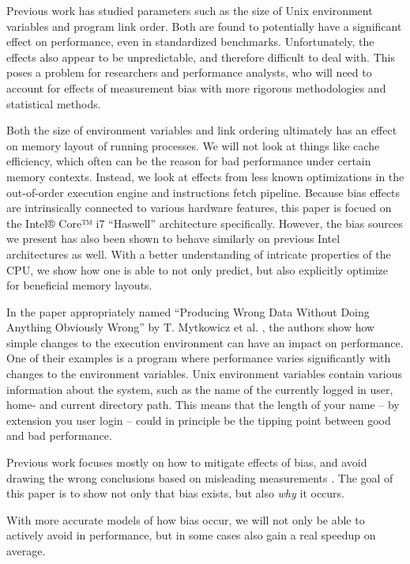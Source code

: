 \documentclass[a4paper,11pt,twocolumn,twoside]{article}
\begin{document}
Previous work has studied parameters such as the size of Unix environment variables and program link order. 
Both are found to potentially have a significant effect on performance, even in standardized benchmarks. 
Unfortunately, the effects also appear to be unpredictable, and therefore difficult to deal with. 
This poses a problem for researchers and performance analysts, who will need to account for effects of measurement bias with more rigorous methodologies and statistical methods.

Both the size of environment variables and link ordering ultimately has an effect on memory layout of running processes. 
We will not look at things like cache efficiency, which often can be the reason for bad performance under certain memory contexts. 
Instead, we look at effects from less known optimizations in the out-of-order execution engine and instructions fetch pipeline. 
Because bias effects are intrinsically connected to various hardware features, this paper is focued on the Intel® Core™ i7 “Haswell” architecture specifically. 
However, the bias sources we present has also been shown to behave similarly on previous Intel architectures as well.
With a better understanding of intricate properties of the CPU, we show how one is able to not only predict, but also explicitly optimize for beneficial memory layouts. 

In the paper appropriately named “Producing Wrong Data Without Doing Anything Obviously Wrong” by T. Mytkowicz et al. \cite{Mytkowicz:2009:WrongData}, the authors show how simple changes to the execution environment can have an impact on performance. 
One of their examples is a program where performance varies significantly with changes to the environment variables. 
Unix environment variables contain various information about the system, such as the name of the currently logged in user, home- and current directory path.
This means that the length of your name -- by extension you user login -- could in principle be the tipping point between good and bad performance.

Previous work focuses mostly on how to mitigate effects of bias, and avoid drawing the wrong conclusions based on misleading measurements \cite{Mytkowicz:2008:Easy, Mytkowicz:2009:WrongData}.
The goal of this paper is to show not only that bias exists, but also \emph{why} it occurs. 

With more accurate models of how bias occur, we will not only be able to actively avoid in performance, but in some cases also gain a real speedup on average.
\end{document}
